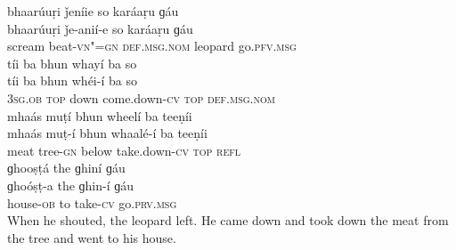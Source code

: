\begin{exe}
\ex
\label{ex:16}
\glll bhaarúuṛi	ǰeníie	so	karáaṛu	ɡáu \\
bhaarúuṛi	ǰe-anií-e	so	karáaṛu	ɡáu \\
scream	beat-\textsc{vn"=gn}	\textsc{def.msg.nom}	leopard	go.\textsc{pfv.msg} \\
\glll tíi	ba	bhun	whayí	ba	so \\
tíi	ba	bhun	whéi-í	ba	so \\
\textsc{3sg.ob} \textsc{top}	down	come.down-\textsc{cv} \textsc{top}	\textsc{def.msg.nom} \\
\glll mhaás	muṭí	bhun	wheelí	ba	teeṇíi \\
mhaás	muṭ-í	bhun	whaalé-í	ba	teeṇíi \\
meat	tree-\textsc{gn}	below	take.down-\textsc{cv} \textsc{top} 	\textsc{refl} \\
\glll ɡhooṣṭá	the	ɡhiní	ɡáu \\
ɡhoóṣṭ-a	the	ɡhin-í	ɡáu \\
house-\textsc{ob}	to	take-\textsc{cv}	go.\textsc{prv.msg} \\
\glt When he shouted, the leopard left. He came down and took down the meat from the tree and went to his house.

\end{exe}